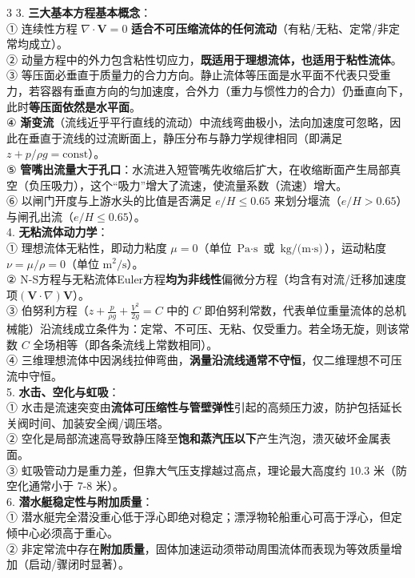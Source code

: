 \documentclass[a4paper]{article}
\newcommand{\key}[1]{{\bfseries\color{h3}#1}}
\newcommand{\warn}[1]{{\bfseries\color{warnc}#1}}
\begin{document}
\begin{multicols*}{3}
{3. \key{三大基本方程基本概念}：\\
{①} 连续性方程 $\nabla\cdot\bm V=0$ \warn{适合不可压缩流体的任何流动}（有粘/无粘、定常/非定常均成立）。\\
{②} 动量方程中的外力包含粘性切应力，\warn{既适用于理想流体，也适用于粘性流体}。\\
{③} 等压面必垂直于质量力的合力方向。静止流体等压面是水平面不代表只受重力，若容器有垂直方向的匀加速度，合外力（重力与惯性力的合力）仍垂直向下，此时\warn{等压面依然是水平面}。\\
{④} \key{渐变流}（流线近乎平行直线的流动）中流线弯曲极小，法向加速度可忽略，因此在垂直于流线的过流断面上，静压分布与静力学规律相同（即满足 $z+p/\rho g = \text{const}$）。\\
{⑤} \key{管嘴出流量大于孔口}：水流进入短管嘴先收缩后扩大，在收缩断面产生局部真空（负压吸力），这个“吸力”增大了流速，使流量系数（流速）增大。\\
{⑥} 以闸门开度与上游水头的比值是否满足 $e/H \le 0.65$ 来划分堰流（$e/H > 0.65$）与闸孔出流（$e/H \le 0.65$）。\\
4. \key{无粘流体动力学}：\\
{①} 理想流体无粘性，即动力粘度 $\mu=0$（单位 $\text{Pa}\cdot\text{s}$ 或 $\text{kg/(m}\cdot\text{s)}$），运动粘度 $\nu=\mu/\rho=0$（单位 $\text{m}^2/\text{s}$）。\\
{②} N-S方程与无粘流体Euler方程\warn{均为非线性}偏微分方程（均含有对流/迁移加速度项$(\bm V\cdot\nabla)\bm V$）。\\
{③} 伯努利方程（$z + \frac{p}{\rho g} + \frac{V^2}{2g} = C$ 中的 $C$ 即伯努利常数，代表单位重量流体的总机械能）沿流线成立条件为：定常、不可压、无粘、仅受重力。若全场无旋，则该常数 $C$ 全场相等（即各条流线上常数相同）。\\
{④} 三维理想流体中因涡线拉伸弯曲，\warn{涡量沿流线通常不守恒}，仅二维理想不可压流中守恒。\\
5. \key{水击、空化与虹吸}：\\
{①} 水击是流速突变由\warn{流体可压缩性与管壁弹性}引起的高频压力波，防护包括延长关阀时间、加装安全阀/调压塔。\\
{②} 空化是局部流速高导致静压降至\warn{饱和蒸汽压以下}产生汽泡，溃灭破坏金属表面。\\
{③} 虹吸管动力是重力差，但靠大气压支撑越过高点，理论最大高度约 10.3 米（防空化通常小于 7-8 米）。\\
6. \key{潜水艇稳定性与附加质量}：\\
{①} 潜水艇完全潜没重心低于浮心即绝对稳定；漂浮物轮船重心可高于浮心，但定倾中心必须高于重心。\\
{②} 非定常流中存在\warn{附加质量}，固体加速运动须带动周围流体而表现为等效质量增加（启动/骤闭时显著）。
}


\end{multicols*}
\end{document}
